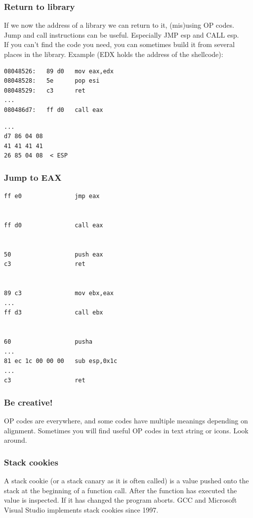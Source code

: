 \documentclass[slidestop,compress,mathserif, xcolor=table]{beamer}
\begin{document}
\begin{frame}[fragile]
  \frametitle{Return to library}

  If we now the address of a library we can return to it, (mis)using OP
  codes. Jump and call instructions can be useful. Especially JMP esp and CALL
  esp.\\[1em]

  If you can't find the code you need, you can sometimes build it from several
  places in the library. Example (EDX holds the address of the shellcode):

\tiny
  \begin{multicols}{2}
\begin{verbatim}
08048526:   89 d0   mov eax,edx
08048528:   5e      pop esi
08048529:   c3      ret
...
080486d7:   ff d0   call eax
\end{verbatim}
\begin{verbatim}
...
d7 86 04 08
41 41 41 41
26 85 04 08  < ESP
\end{verbatim}
  \end{multicols}
\end{frame}

\begin{frame}[fragile]
  \frametitle{Jump to EAX}

\tiny
\begin{verbatim}
ff e0               jmp eax


ff d0               call eax


50                  push eax
c3                  ret


89 c3               mov ebx,eax
...
ff d3               call ebx


60                  pusha
...
81 ec 1c 00 00 00   sub esp,0x1c
...
c3                  ret
\end{verbatim}
\end{frame}

\begin{frame}
  \frametitle{Be creative!}

  OP codes are everywhere, and some codes have multiple meanings depending on
  alignment. Sometimes you will find useful OP codes in text string or
  icons. Look around.
\end{frame}

\begin{frame}
  \frametitle{Stack cookies}

  A stack cookie (or a stack canary as it is often called) is a value pushed
  onto the stack at the beginning of a function call. After the function has
  executed the value is inspected. If it has changed the program aborts. GCC and
  Microsoft Visual Studio implements stack cookies since 1997.
\end{frame}
\end{document}
